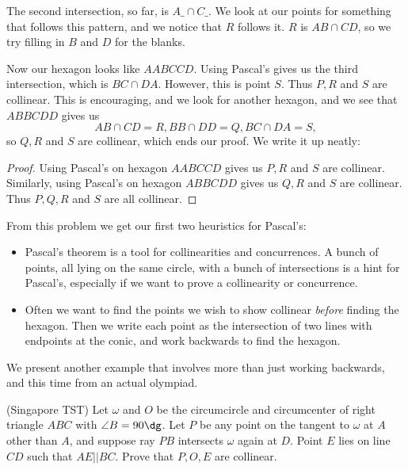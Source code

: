 \documentclass[11pt,paper=letter]{scrartcl}
\begin{document}
The second intersection, so far, is $A\_ \cap C\_$. We look at our points for something that follows this pattern, and we notice that $R$ follows it. $R$ is $AB \cap CD$, so we try filling in $B$ and $D$ for the blanks.

Now our hexagon looks like $AABCCD$. Using Pascal's gives us the third intersection, which is $BC \cap DA$. However, this is point $S$. Thus $P, R$ and $S$ are collinear. This is encouraging, and we look for another hexagon, and we see that $ABBCDD$ gives us $$AB \cap CD = R, BB \cap DD = Q, BC \cap DA = S,$$ so $Q, R$ and $S$ are collinear, which ends our proof. We write it up neatly:

\begin{proof}
  Using Pascal's on hexagon $AABCCD$ gives us $P, R$ and $S$ are collinear. Similarly, using Pascal's on hexagon $ABBCDD$ gives us $Q, R$ and $S$ are collinear. Thus $P, Q, R$ and $S$ are all collinear.
\end{proof}

From this problem we get our first two heuristics for Pascal's:

\begin{itemize}

\item Pascal's theorem is a tool for collinearities and concurrences. A bunch of points, all lying on the same circle, with a bunch of intersections is a hint for Pascal's, especially if we want to prove a collinearity or concurrence.

\item Often we want to find the points we wish to show collinear \emph{before} finding the hexagon. Then we write each point as the intersection of two lines with endpoints at the conic, and work backwards to find the hexagon.

\end{itemize}

We present another example that involves more than just working backwards, and this time from an actual olympiad.

\begin{problem}
  (Singapore TST) Let $\omega$ and $O$ be the circumcircle and circumcenter of right triangle $ABC$ with $\angle B = 90\dg$. Let $P$ be any point on the tangent to $\omega$ at $A$ other than $A$, and suppose ray $PB$ intersects $\omega$ again at $D$. Point $E$ lies on line $CD$ such that $AE || BC$. Prove that $P, O, E$ are collinear.
\end{problem}
\end{document}

